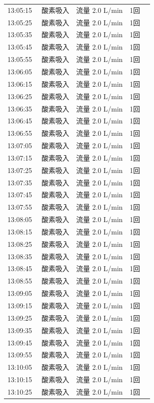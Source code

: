 \documentclass[UTF8,10pt,a4paper,fontset=fandol]{ctexart}
\begin{document}
\begin{minipage}[t]{0.48\linewidth}
\begin{tabular}{@{}p{0.22\linewidth}p{0.72\linewidth}@{}}
13:05:15 & 酸素吸入　流量 2.0 L/min　1回\\
13:05:25 & 酸素吸入　流量 2.0 L/min　1回\\
13:05:35 & 酸素吸入　流量 2.0 L/min　1回\\
13:05:45 & 酸素吸入　流量 2.0 L/min　1回\\
13:05:55 & 酸素吸入　流量 2.0 L/min　1回\\
13:06:05 & 酸素吸入　流量 2.0 L/min　1回\\
13:06:15 & 酸素吸入　流量 2.0 L/min　1回\\
13:06:25 & 酸素吸入　流量 2.0 L/min　1回\\
13:06:35 & 酸素吸入　流量 2.0 L/min　1回\\
13:06:45 & 酸素吸入　流量 2.0 L/min　1回\\
13:06:55 & 酸素吸入　流量 2.0 L/min　1回\\
13:07:05 & 酸素吸入　流量 2.0 L/min　1回\\
13:07:15 & 酸素吸入　流量 2.0 L/min　1回\\
13:07:25 & 酸素吸入　流量 2.0 L/min　1回\\
13:07:35 & 酸素吸入　流量 2.0 L/min　1回\\
13:07:45 & 酸素吸入　流量 2.0 L/min　1回\\
13:07:55 & 酸素吸入　流量 2.0 L/min　1回\\
13:08:05 & 酸素吸入　流量 2.0 L/min　1回\\
13:08:15 & 酸素吸入　流量 2.0 L/min　1回\\
13:08:25 & 酸素吸入　流量 2.0 L/min　1回\\
13:08:35 & 酸素吸入　流量 2.0 L/min　1回\\
13:08:45 & 酸素吸入　流量 2.0 L/min　1回\\
13:08:55 & 酸素吸入　流量 2.0 L/min　1回\\
13:09:05 & 酸素吸入　流量 2.0 L/min　1回\\
13:09:15 & 酸素吸入　流量 2.0 L/min　1回\\
13:09:25 & 酸素吸入　流量 2.0 L/min　1回\\
13:09:35 & 酸素吸入　流量 2.0 L/min　1回\\
13:09:45 & 酸素吸入　流量 2.0 L/min　1回\\
13:09:55 & 酸素吸入　流量 2.0 L/min　1回\\
13:10:05 & 酸素吸入　流量 2.0 L/min　1回\\
13:10:15 & 酸素吸入　流量 2.0 L/min　1回\\
13:10:25 & 酸素吸入　流量 2.0 L/min　1回\\

\end{tabular}
\end{minipage}
\end{document}
